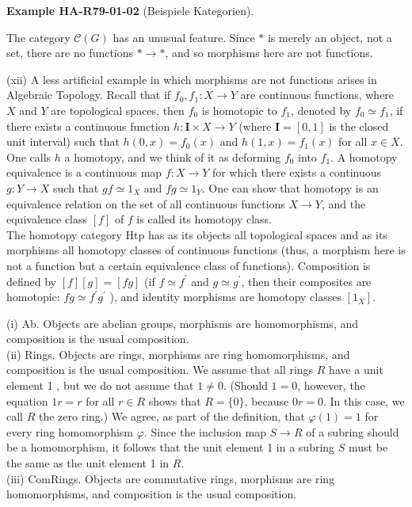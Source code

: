 \documentclass[10pt, letterpaper]{article}
\newcommand{\CustomHeading}[3]{%
  \par\medskip\noindent%
  \textbf{#1 #2} \textnormal{(#3)}.\enskip%
}
\newenvironment{EXA}[2]{\begin{unitbox}\CustomHeading{Example}{#1}{#2}}{\end{unitbox}}
\begin{document}
\begin{EXA}{HA-R79-01-02}{Beispiele Kategorien}
The category $\mathcal{C}(G)$ has an unusual feature. Since $*$ is merely an object, not a set, there are no functions $* \rightarrow *$, and so morphisms here are not functions.


(xii) A less artificial example in which morphisms are not functions arises in Algebraic Topology. Recall that if $f_{0}, f_{1}: X \rightarrow Y$ are continuous functions, where $X$ and $Y$ are topological spaces, then $f_{0}$ is homotopic to $f_{1}$, denoted by $f_{0} \simeq f_{1}$, if there exists a continuous function $h: \mathbf{I} \times X \rightarrow Y$ (where $\mathbf{I}=[0,1]$ is the closed unit interval) such that $h(0, x)=f_{0}(x)$ and $h(1, x)=f_{1}(x)$ for all $x \in X$. One calls $h$ a homotopy, and we think of it as deforming $f_{0}$ into $f_{1}$. A homotopy equivalence is a continuous map $f: X \rightarrow Y$ for which there exists a continuous $g: Y \rightarrow X$ such that $g f \simeq 1_{X}$ and $f g \simeq 1_{Y}$. One can show that homotopy is an equivalence relation on the set of all continuous functions $X \rightarrow Y$, and the equivalence class $[f]$ of $f$ is called its homotopy class.\\
The homotopy category Htp has as its objects all topological spaces and as its morphisms all homotopy classes of continuous functions (thus, a morphism here is not a function but a certain equivalence class of functions). Composition is defined by $[f][g]=[f g]$ (if $f \simeq f^{\prime}$ and $g \simeq g^{\prime}$, then their composites are homotopic: $f g \simeq f^{\prime} g^{\prime}$ ), and identity morphisms are homotopy classes $\left[1_{X}\right]$.



(i) Ab. Objects are abelian groups, morphisms are homomorphisms, and composition is the usual composition.\\



(ii) Rings. Objects are rings, morphisms are ring homomorphisms, and composition is the usual composition. We assume that all rings $R$ have a unit element 1 , but we do not assume that $1 \neq 0$. (Should $1=0$, however, the equation $1 r=r$ for all $r \in R$ shows that $R=\{0\}$, because $0 r=0$. In this case, we call $R$ the zero ring.) We agree, as part of the definition, that $\varphi(1)=1$ for every ring homomorphism $\varphi$. Since the inclusion map $S \rightarrow R$ of a subring should be a homomorphism, it follows that the unit element 1 in a subring $S$ must be the same as the unit element 1 in $R$.\\


(iii) ComRings. Objects are commutative rings, morphisms are ring homomorphisms, and composition is the usual composition.
\end{EXA}
\end{document}
